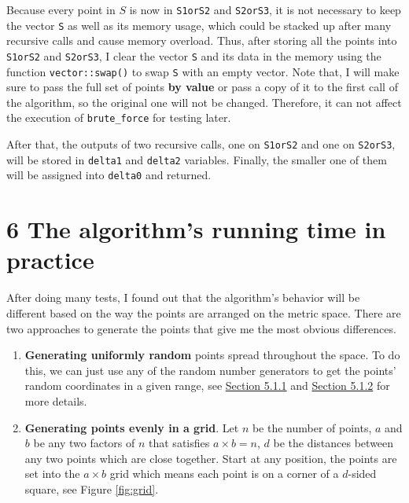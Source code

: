 \documentclass[12pt,english,]{article}
\newcommand{\code}[1]{\colorbox{lbcolor}{\texttt{#1}}}
\begin{document}
Because every point in \(S\) is now in \code{S1orS2} and \code{S2orS3},
it is not necessary to keep the vector \code{S} as well as its memory
usage, which could be stacked up after many recursive calls and cause
memory overload. Thus, after storing all the points into \code{S1orS2}
and \code{S2orS3}, I clear the vector \code{S} and its data in the
memory using the function \code{vector::swap()} to swap \code{S} with an
empty vector. Note that, I will make sure to pass the full set of points
\textbf{by value} or pass a copy of it to the first call of the
algorithm, so the original one will not be changed. Therefore, it can
not affect the execution of \code{brute\_force} for testing later.

After that, the outputs of two recursive calls, one on \code{S1orS2} and
one on \code{S2orS3}, will be stored in \code{delta1} and \code{delta2}
variables. Finally, the smaller one of them will be assigned into
\code{delta0} and returned.

\hypertarget{section6}{%
\section{\texorpdfstring{6 \enspace The algorithm's running time in
practice}{6 The algorithm's running time in practice}}\label{section6}}

After doing many tests, I found out that the algorithm's behavior will
be different based on the way the points are arranged on the metric
space. There are two approaches to generate the points that give me the
most obvious differences.

\begin{enumerate}
\def\labelenumi{\arabic{enumi}.}
\item
  \textbf{Generating uniformly random} points spread throughout the
  space. To do this, we can just use any of the random number generators
  to get the points' random coordinates in a given range, see
  \protect\hyperlink{section5.1.1}{Section 5.1.1} and
  \protect\hyperlink{section5.1.2}{Section 5.1.2} for more details.
\item
  \textbf{Generating points evenly in a grid}. Let \(n\) be the number
  of points, \(a\) and \(b\) be any two factors of \(n\) that satisfies
  \(a\times b = n\), \(d\) be the distances between any two points which
  are close together. Start at any position, the points are set into the
  \(a \times b\) grid which means each point is on a corner of a
  \(d\)-sided square, see Figure \ref{fig:grid}.
\end{enumerate}
\end{document}
